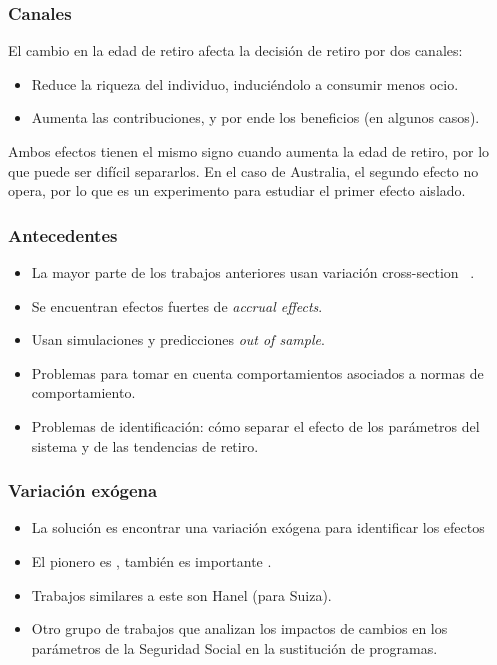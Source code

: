 \documentclass{beamer}
\begin{document}
    \frame
        {
          \frametitle{Canales}

          El cambio en la edad de retiro afecta la decisión de retiro por dos canales:
          \begin{itemize}
          \item Reduce la riqueza del individuo, induciéndolo a consumir menos ocio.
          \item Aumenta las contribuciones, y por ende los beneficios (en algunos casos).
          \end{itemize}

          Ambos efectos tienen el mismo signo cuando aumenta la edad de retiro, por lo que puede ser difícil separarlos. En el caso de Australia, el segundo efecto no opera, por lo que es un experimento para estudiar el primer efecto aislado.

        }
        \frame
            {
              \frametitle{Antecedentes}
              \begin{itemize}
              \item La mayor parte de los trabajos anteriores usan variación cross-section
                ~\cite{coile}.

              \item Se encuentran efectos fuertes de \textit{accrual effects}.
              \item Usan simulaciones y predicciones \textit{out of sample}.
              \item Problemas para tomar en cuenta comportamientos asociados a normas de comportamiento.
              \item Problemas de identificación: cómo separar el efecto
                de los parámetros del sistema y de las tendencias de retiro.
              \end{itemize}

            }
            \frame
                {
                  \frametitle{Variación exógena}

                  \begin{itemize}
                  \item La solución es encontrar una variación exógena para identificar los efectos

                  \item El pionero es \cite{krueger}, también es importante \cite{mastrobouni}.
                  \item Trabajos similares a este son Hanel (para Suiza).
                  \item Otro grupo de trabajos que analizan los impactos de cambios en los parámetros de la Seguridad Social en la sustitución de programas.

                  \end{itemize}
                  }
\end{document}
